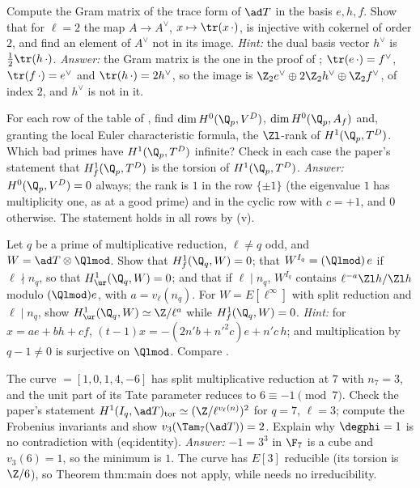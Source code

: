 \begin{exercise}[the trace form at $\ell=2$]\label{ex:blochkato:ex-gram}
Compute the Gram matrix of the trace form of $\ad T$ in the basis $e,h,f$. Show that for $\ell=2$ the map $A\to A^\vee$, $x\mapsto\tr(x\,\cdot)$, is injective with cokernel of order $2$,
and find an element of $A^\vee$ not in its image.
\emph{Hint:} the dual basis vector $h^\vee$ is $\tfrac12\tr(h\,\cdot)$. \emph{Answer:} the Gram matrix is the one in the proof of ;
$\tr(e\,\cdot)=f^\vee$, $\tr(f\,\cdot)=e^\vee$ and $\tr(h\,\cdot)=2h^\vee$, so the image is $\Z_2e^\vee\oplus2\Z_2h^\vee\oplus\Z_2f^\vee$, of index $2$, and $h^\vee$ is not in it.
\end{exercise}

\begin{exercise}\label{ex:blochkato:ex-local-ranks}
\sloppy For each row of the table of , find $\dim H^0(\Q_p,V^D)$, $\dim H^0(\Q_p,A_f)$ and, granting the local Euler characteristic formula, the
$\Zl$-rank of $H^1(\Q_p,T^D)$. Which bad primes have $H^1(\Q_p,T^D)$ infinite? Check in each case the paper's statement that $H^1_f(\Q_p,T^D)$ is the torsion of $H^1(\Q_p,T^D)$.
\emph{Answer:} $H^0(\Q_p,V^D)=0$ always; the rank is $1$ in the row $\{\pm1\}$ (the eigenvalue $1$ has multiplicity one, as at a good prime) and in the cyclic row with $c=+1$, and
$0$ otherwise. The statement holds in all rows by (v).
\end{exercise}

\begin{exercise}\label{ex:blochkato:ex-mult}
Let $q$ be a prime of multiplicative reduction, $\ell\ne q$ odd, and $W=\ad T\otimes\Qlmod$. Show that $H^1_f(\Q_q,W)=0$; that $W^{I_q}=(\Qlmod)\,e$ if $\ell\nmid n_q$, so that
$H^1_{\ur}(\Q_q,W)=0$; and that if $\ell\mid n_q$, $W^{I_q}$ contains $\ell^{-a}\Zl h/\Zl h$ modulo $(\Qlmod)e$, with $a=v_\ell(n_q)$. For $W=E[\ell^\infty]$ with split reduction and $\ell\mid n_q$, show
$H^1_{\ur}(\Q_q,W)\simeq\Z/\ell^{a}$ while $H^1_f(\Q_q,W)=0$.
\emph{Hint:} for $x=ae+bh+cf$, $(t-1)x=-(2n'b+n'^2c)e+n'c\,h$; and multiplication by $q-1\ne0$ is surjective on $\Qlmod$. Compare .
\end{exercise}

\begin{exercise}\label{ex:blochkato:ex-14a1}
The curve  $=[1,0,1,4,-6]$ has split multiplicative reduction at $7$ with $n_7=3$, and the unit part of its Tate parameter reduces to $6\equiv-1\pmod7$. Check the
paper's statement $H^1(I_q,\ad T)_{\mathrm{tor}}\simeq(\Z/\ell^{v_\ell(n)})^2$ for $q=7$, $\ell=3$; compute the Frobenius invariants and show $v_3(\Tam_7(\ad T))=2$. Explain why $\degphi=1$ is no
contradiction with (eq:identity).
\emph{Answer:} $-1=3^3$ in $\F_7$ is a cube and $v_3(6)=1$, so the minimum is $1$. The curve has $E[3]$ reducible (its torsion is $\Z/6$), so Theorem thm:main does not apply,
while  needs no irreducibility.
\end{exercise}

